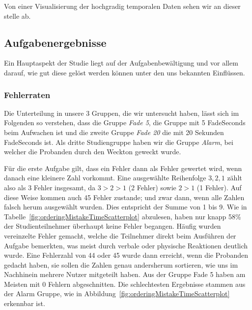 Von einer Visualisierung der hochgradig temporalen Daten sehen wir an dieser stelle ab.

\subsection{Aufgabenergebnisse} 

Ein Hauptaspekt der Studie liegt auf der Aufgabenbewältigung und vor allem darauf, wie gut diese gelöst werden können unter den uns bekannten Einflüssen. 

\subsubsection{Fehlerraten}

Die Unterteilung in unsere 3 Gruppen, die wir untersucht haben, lässt sich im Folgenden so verstehen, dass die Gruppe \textit{Fade 5}, die Gruppe mit 5 FadeSeconds beim Aufwachen ist und die zweite Gruppe \textit{Fade 20} die mit 20 Sekunden FadeSeconds ist. Als dritte Studiengruppe haben wir die Gruppe \textit{Alarm}, bei welcher die Probanden durch den Weckton geweckt wurde.

Für die erste Aufgabe gilt, dass ein Fehler dann als Fehler gewertet wird, wenn danach eine kleinere Zahl vorkommt. Eine ausgewählte Reihenfolge $3, 2, 1$ zählt also als 3 Fehler insgesamt, da $3 > 2 > 1$ (2 Fehler) sowie $2 > 1$ (1 Fehler). Auf diese Weise kommen auch 45 Fehler zustande; und zwar dann, wenn alle Zahlen falsch herum ausgewählt wurden. Dies entspricht der Summe von 1 bis 9.
Wie in Tabelle~\ref{fig:orderingMistakeTimeScatterplot} abzulesen, haben nur knapp 58\% der Studienteilnehmer überhaupt keine Fehler begangen. Häufig wurden vereinzelte Fehler gemacht, welche die Teilnehmer direkt beim Ausführen der Aufgabe bemerkten, was meist durch verbale oder physische Reaktionen deutlich wurde. 
Eine Fehlerzahl von 44 oder 45 wurde dann erreicht, wenn die Probanden gedacht haben, sie sollen die Zahlen genau andersherum sortieren, wie uns im Nachhinein mehrere Nutzer mitgeteilt haben.
Aus der Gruppe Fade 5 haben am Meisten mit 0 Fehlern abgeschnitten. Die schlechtesten Ergebnisse stammen aus der Alarm Gruppe, wie in Abbildung~\ref{fig:orderingMistakeTimeScatterplot} erkennbar ist.

